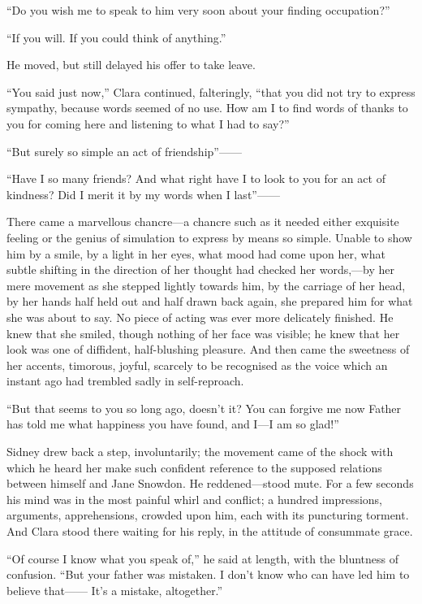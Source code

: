 ``Do you wish me to speak to him very soon about your finding
occupation?''

``If you will. If you could think of anything.''

He moved, but still delayed his offer to take leave.

``You said just now,'' Clara continued, falteringly, ``that you did not
try to express sympathy, because words seemed of no use. How am I to
find words of thanks to you for coming here and listening to what I had
to say?''

``But surely so simple an act of friendship''{{------}}

{}``Have I so many friends? And what right have I to look to you for an
act of kindness? Did I merit it by my words when I last''{{------}}

There came a marvellous chancre---a chancre such as it needed either
exquisite feeling or the genius of simulation to express by means so
simple. Unable to show him by a smile, by a light in her eyes, what mood
had come upon her, what subtle shifting in the direction of her thought
had checked her words,---by her mere movement as she stepped lightly
towards him, by the carriage of her head, by her hands half held out and
half drawn back again, she prepared him for what she was about to say.
No piece of acting was ever more delicately finished. He knew that she
smiled, though nothing of her face was visible; he knew that her look
was one of diffident, half-blushing pleasure. And then came the
sweetness of her accents, timorous, joyful, scarcely to be recognised as
the voice which an instant ago had trembled sadly in self-reproach.

``But that seems to you so long ago, doesn't it? You can forgive me now
Father has told me what happiness you have found, and I---I am so
glad!''

{}Sidney drew back a step, involuntarily; the movement came of the shock
with which he heard her make such confident reference to the supposed
relations between himself and Jane Snowdon. He reddened---stood mute.
For a few seconds his mind was in the most painful whirl and conflict; a
hundred impressions, arguments, apprehensions, crowded upon him, each
with its puncturing torment. And Clara stood there waiting for his
reply, in the attitude of consummate grace.

``Of course I know what you speak of,'' he said at length, with the
bluntness of confusion. ``But your father was mistaken. I don't know who
can have led him to believe that{{------}} It's a mistake, altogether.''

